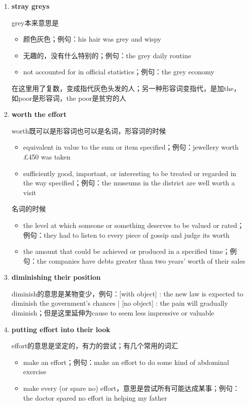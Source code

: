 \documentclass[UTF8]{ctexart}
\begin{document}
\begin{enumerate}
\item \textbf{stray greys}\label{voc:12}

grey本来意思是
\begin{itemize}
\item 颜色灰色；例句：his hair was grey and wispy
\item 无趣的，没有什么特别的；例句：the grey daily routine
\item not accounted for in official statistics；例句：the grey economy
\end{itemize}
在这里用了复数，变成指代灰色头发的人；另一种形容词变指代，是加the，如poor是形容词，the poor是贫穷的人

\item \textbf{worth the effort}\label{voc:13}

worth既可以是形容词也可以是名词，形容词的时候
\begin{itemize}
\item equivalent in value to the sum or item specified；例句：jewellery worth £450 was taken
\item sufficiently good, important, or interesting to be treated or regarded in the way specified；例句：the museums in the district are well worth a visit
\end{itemize}
名词的时候
\begin{itemize}
\item the level at which someone or something deserves to be valued or rated；例句：they had to listen to every piece of gossip and judge its worth
\item the amount that could be achieved or produced in a specified time；例句：the companies have debts greater than two years' worth of their sales
\end{itemize}


\item \textbf{diminishing their position}\label{voc:14}

diminish的意思是某物变少，例句：[with object] : the new law is expected to diminish the government's chances | [no object] : the pain will gradually diminish；但是这里延伸为cause to seem less impressive or valuable

\item \textbf{putting effort into their look}\label{voc:15}

effort的意思是坚定的，有力的尝试；有几个常用的词汇
\begin{itemize}
\item make an effort；例句：make an effort to do some kind of abdominal exercise
\item make every (or spare no) effort，意思是尝试所有可能达成某事；例句：the doctor spared no effort in helping my father
\end{itemize}


\end{enumerate}
\end{document}
